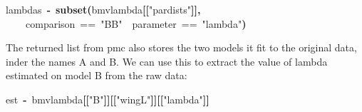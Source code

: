 \documentclass{elsarticle}
\makeatletter
\newcommand{\hlfunctioncall}[1]{\textcolor[rgb]{.5,0,.33}{\textbf{#1}}}%
\newcommand{\hlstring}[1]{\textcolor[rgb]{.6,.6,1}{#1}}%
\newcommand{\hlkeyword}[1]{\textbf{#1}}%
\newcommand{\hlassignement}[1]{\textbf{#1}}%
\newcommand{\hlsymbol}[1]{#1}%
\newcommand{\hlstd}[1]{\textcolor[rgb]{0,0,0}{#1}}%
\newenvironment{kframe}{%
 \def\FrameCommand##1{\hskip\@totalleftmargin \hskip-\fboxsep
 \colorbox{shadecolor}{##1}\hskip-\fboxsep
     \hskip-\linewidth \hskip-\@totalleftmargin \hskip\columnwidth}%
 \MakeFramed {\advance\hsize-\width
   \@totalleftmargin\z@ \linewidth\hsize
   \@setminipage}}%
 {\par\unskip\endMakeFramed}
\newenvironment{knitrout}{}{} %
\makeatother
\begin{document}
\begin{knitrout}
\color{fgcolor}\begin{kframe}
\begin{flushleft}
\ttfamily\noindent
\hlsymbol{lambdas}{\ }\hlassignement{\usebox{\hlnormalsizeboxlessthan}-}{\ }\hlfunctioncall{subset}\hlkeyword{(}\hlsymbol{bm\usebox{\hlnormalsizeboxunderscore}v\usebox{\hlnormalsizeboxunderscore}lambda}\hlkeyword{[[}\hlstring{"{}par\usebox{\hlnormalsizeboxunderscore}dists"{}}\hlkeyword{]}\hlkeyword{]}\hlkeyword{,}\hspace*{\fill}\\
\hlstd{}{\ }{\ }{\ }{\ }\hlsymbol{comparison}{\ }=={\ }\hlstring{"{}BB"{}}{\ }\hlkeyword{\usebox{\hlnormalsizeboxand}}{\ }\hlsymbol{parameter}{\ }=={\ }\hlstring{"{}lambda"{}}\hlkeyword{)}\mbox{}
\normalfont
\end{flushleft}
\end{kframe}
\end{knitrout}


The returned list from pmc also stores the two models it fit to the original data, inder the names A and B.  
We can use this to extract the value of lambda estimated on model B from the raw data:

\begin{knitrout}
\color{fgcolor}\begin{kframe}
\begin{flushleft}
\ttfamily\noindent
\hlsymbol{est}{\ }\hlassignement{\usebox{\hlnormalsizeboxlessthan}-}{\ }\hlsymbol{bm\usebox{\hlnormalsizeboxunderscore}v\usebox{\hlnormalsizeboxunderscore}lambda}\hlkeyword{[[}\hlstring{"{}B"{}}\hlkeyword{]}\hlkeyword{]}\hlkeyword{[[}\hlstring{"{}wingL"{}}\hlkeyword{]}\hlkeyword{]}\hlkeyword{[[}\hlstring{"{}lambda"{}}\hlkeyword{]}\hlkeyword{]}\mbox{}
\normalfont
\end{flushleft}
\end{kframe}
\end{knitrout}
\end{document}
